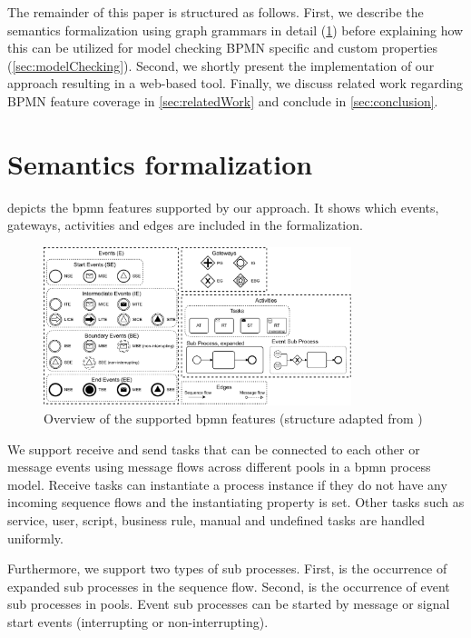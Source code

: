 \documentclass[adraft, copyright, creativecommons]{eptcs} %
\begin{document}
The remainder of this paper is structured as follows.
First, we describe the semantics formalization using graph grammars in detail (\cref{sec:formalization}) before explaining how this can be utilized for model checking BPMN specific and custom properties (\cref{sec:modelChecking}).
Second, we shortly present the implementation of our approach resulting in a web-based tool.
Finally, we discuss related work regarding BPMN feature coverage in \cref{sec:relatedWork} and conclude in \cref{sec:conclusion}.

\section{Semantics formalization} \label{sec:formalization}

 depicts the \gls*{bpmn} features supported by our approach.
It shows which events, gateways, activities and edges are included in the formalization.

\begin{figure}[h]
    \centering
    \includegraphics[width=0.8\textwidth]{images/bpmn_semantics-feature_overview.pdf}
    \caption{Overview of the supported \gls*{bpmn} features (structure adapted from \cite{houhouFirstOrderLogicVerification2022})}
    \label{fig:bpmnfeaturesOverview}
\end{figure}

We support receive and send tasks that can be connected to each other or message events using message flows across different pools in a \gls*{bpmn} process model.
Receive tasks can instantiate a process instance if they do not have any incoming sequence flows and the \textsf{instantiating} property is set.
Other tasks such as service, user, script, business rule, manual and undefined tasks are handled uniformly.

Furthermore, we support two types of sub processes.
First, is the occurrence of expanded sub processes in the sequence flow.
Second, is the occurrence of event sub processes in pools.
Event sub processes can be started by message or signal start events (interrupting or non-interrupting).
\end{document}
